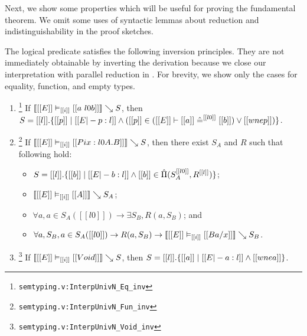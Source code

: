 \documentclass[acmsmall, screen=true, nonacm=true,
  review=\ifpublic false\else true\fi,
  anonymous=\ifanonymous true\else false\fi
]{acmart}
\DeclarePairedDelimiter{\bracks}{\llbracket}{\rrbracket}
\DeclarePairedDelimiter{\braces}{\lbrace}{\rbrace}
\newcommand{\suppl}[3]{{\scriptsize\texttt{#2:#3}}}
\newcommand{\interp}[4]{\bracks{#1 \vDash_{#2} #3} \searrow #4}
\newcommand{\buildset}[3]{#2 . \braces{#1 \mid #3}}
\newcommand{\member}[3]{#1 \in #3(#2)}
\newcommand{\prodspace}[5]{#1 \in \hat{\Pi}(#2^{#3}, #4^{#5})}
\newcommand{\eqspace}[5]{#1 \in (#2 \vdash #3 \mathrel{\hat{=}}^{#5} #4)}
\newlength{\punctwidth}
\newcommand{\stack}[1]{%
  \settowidth{\punctwidth}{#1}%
  \hspace*{-\the\punctwidth}%
}
\begin{document}

Next, we show some properties which will be useful for proving the fundamental theorem.
We omit some uses of syntactic lemmas about reduction and indistinguishability
in the proof sketches.

The logical predicate satisfies the following inversion principles. 
They are not immediately obtainable by inverting
the derivation because we close our interpretation with parallel
reduction in . For brevity, we show only the cases
for equality, function, and empty types.

\begin{lemma}
  \label{lem:interpinv}\leavevmode
  \begin{enumerate}
  \item \stack{~}\footnote{\suppl{theories}{semtyping.v}{InterpUnivN\_Eq\_inv}}
    \label{lem:interpinveq}
    If $\interp{[[E]]}{[[i]]}{[[a ~ l0 b]]}{S}$, then $S =
    \buildset{[[p]]}{[[l]]}{[[E |- p : l]] \wedge
      (\eqspace{[[p]]}{[[E]]}{[[a]]}{[[b]]}{[[l0]]} \vee [[wne p]])}$.
  \item \stack{~}\footnote{\suppl{theories}{semtyping.v}{InterpUnivN\_Fun\_inv}}
    \label{lem:interpinvfun}
    If $\interp{[[E]]}{[[i]]}{[[Pi x : l0 A . B]]}{S}$, then there
    exist $S_A$ and $R$ such that following hold:
    \begin{itemize}
    \item $S = \buildset{[[b]]}{[[l]]}{[[E |- b : l]] \wedge \prodspace{[[b]]}{S_A}{[[l0]]}{R}{[[l]]}}$;
    \item $\interp{[[E]]}{[[i]]}{[[A]]}{S_A}$;
    \item $\forall a, \member{a}{[[l0]]}{S_A} \to \exists S_B, R(a,
      S_B)$; and
    \item $\forall a, S_B, \member{a}{[[l0]]}{S_A} \to R(a, S_B) \to
      \interp{[[E]]}{[[i]]}{[[B {a / x}]]}{S_B}$.
    \end{itemize}
  \item \stack{~}\footnote{\suppl{theories}{semtyping.v}{InterpUnivN\_Void\_inv}}
    \label{lem:interpinvvoid}
    If $\interp{[[E]]}{[[i]]}{[[Void]]}{S}$, then $S =
    \buildset{[[a]]}{[[l]]}{[[E |- a : l]] \wedge [[wne a]]}$.
  \end{enumerate}
\end{lemma}
\end{document}

